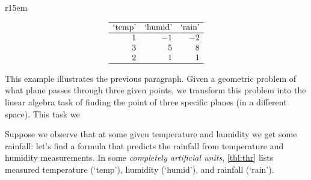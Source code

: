 \begin{table}[9]r{15em}
\caption{In some artificial units, this table lists measured temperature, humidity, and rainfall.}
\label{tbl:thr}
\begin{equation*}
\begin{array}{rrr} \hline
\text{`temp'}&\text{`humid'}&\text{`rain'}\\\hline
1&-1&-2\\
3&5&8\\
2&1&1\\\hline
\end{array}
\end{equation*}
\end{table}
\begin{example} \label{eg:inf3pts}
This example illustrates the previous paragraph.
Given a geometric problem of  what plane passes through three given points, we transform this problem into the linear algebra task of finding the  point of three specific planes (in a different space).
This task we 


Suppose we observe that at some given temperature and humidity we get some rainfall: let's find a formula that predicts the rainfall from temperature and humidity measurements.
In some \emph{completely artificial units}, \cref{tbl:thr} lists measured temperature (`temp'), humidity (`humid'), and rainfall (`rain').


\end{example}
